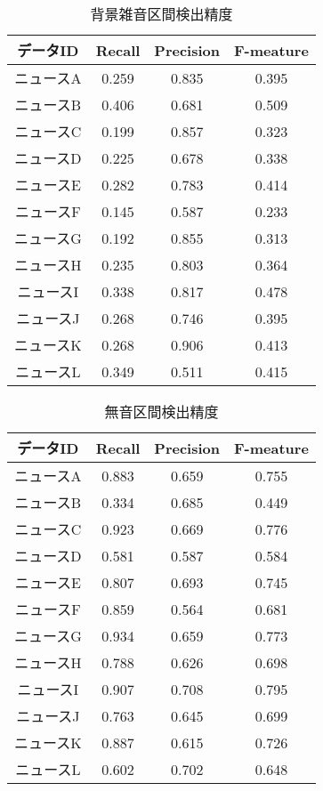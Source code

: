 \begin{table}[H]
  \begin{center}
    \caption{背景雑音区間検出精度 \label{table:NHK_noise_RPF}}
    \begin{tabular}{|c||c|c|c|} \hline
データID & Recall & Precision & F-meature \\ \hline
ニュースA & 0.259 & 0.835 & 0.395 \\ \hline
ニュースB & 0.406 & 0.681 & 0.509 \\ \hline
ニュースC & 0.199 & 0.857 & 0.323 \\ \hline
ニュースD & 0.225 & 0.678 & 0.338 \\ \hline
ニュースE & 0.282 & 0.783 & 0.414 \\ \hline
ニュースF & 0.145 & 0.587 & 0.233 \\ \hline
ニュースG & 0.192 & 0.855 & 0.313 \\ \hline
ニュースH & 0.235 & 0.803 & 0.364 \\ \hline
ニュースI & 0.338 & 0.817 & 0.478 \\ \hline
ニュースJ & 0.268 & 0.746 & 0.395 \\ \hline
ニュースK & 0.268 & 0.906 & 0.413 \\ \hline
ニュースL & 0.349 & 0.511 & 0.415 \\ \hline
    \end{tabular}
  \end{center}
\end{table}

\begin{table}[H]
  \begin{center}
    \caption{無音区間検出精度 \label{table:NHK_pause_RPF}}
    \begin{tabular}{|c||c|c|c|} \hline
データID & Recall & Precision & F-meature \\ \hline
ニュースA & 0.883 & 0.659 & 0.755 \\ \hline
ニュースB & 0.334 & 0.685 & 0.449 \\ \hline
ニュースC & 0.923 & 0.669 & 0.776 \\ \hline
ニュースD & 0.581 & 0.587 & 0.584 \\ \hline
ニュースE & 0.807 & 0.693 & 0.745 \\ \hline
ニュースF & 0.859 & 0.564 & 0.681 \\ \hline
ニュースG & 0.934 & 0.659 & 0.773 \\ \hline
ニュースH & 0.788 & 0.626 & 0.698 \\ \hline
ニュースI & 0.907 & 0.708 & 0.795 \\ \hline
ニュースJ & 0.763 & 0.645 & 0.699 \\ \hline
ニュースK & 0.887 & 0.615 & 0.726 \\ \hline
ニュースL & 0.602 & 0.702 & 0.648 \\ \hline
    \end{tabular}
  \end{center}
\end{table}



